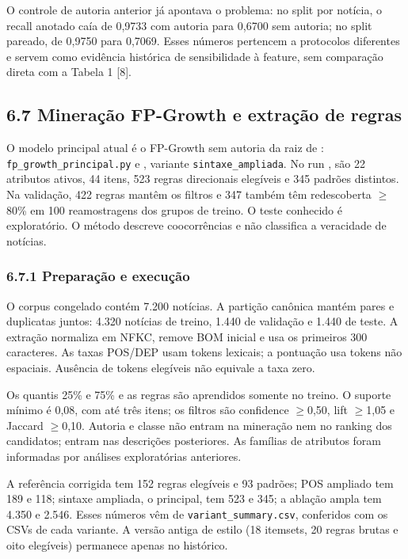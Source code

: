 \documentclass[
  brazilian,
  11pt,
]{article}
\begin{document}
O controle de autoria anterior já apontava o problema: no split por notícia, o recall anotado caía de 0,9733 com autoria para 0,6700 sem autoria; no split pareado, de 0,9750 para 0,7069. Esses números pertencem a protocolos diferentes e servem como evidência histórica de sensibilidade à feature, sem comparação direta com a Tabela 1 {[}8{]}.

\subsection{6.7 Mineração FP-Growth e extração de regras}

O modelo principal atual é o FP-Growth sem autoria da raiz de : \texttt{fp\_growth\_principal.py} e , variante \texttt{sintaxe\_ampliada}. No run , são 22 atributos ativos, 44 itens, 523 regras direcionais elegíveis e 345 padrões distintos. Na validação, 422 regras mantêm os filtros e 347 também têm redescoberta $\geq$80\% em 100 reamostragens dos grupos de treino. O teste conhecido é exploratório. O método descreve coocorrências e não classifica a veracidade de notícias.

\subsubsection{6.7.1 Preparação e execução}

O corpus congelado contém 7.200 notícias. A partição canônica mantém pares e duplicatas juntos: 4.320 notícias de treino, 1.440 de validação e 1.440 de teste. A extração normaliza em NFKC, remove BOM inicial e usa os primeiros 300 caracteres. As taxas POS/DEP usam tokens lexicais; a pontuação usa tokens não espaciais. Ausência de tokens elegíveis não equivale a taxa zero.

Os quantis 25\% e 75\% e as regras são aprendidos somente no treino. O suporte mínimo é 0,08, com até três itens; os filtros são confidence $\geq$0,50, lift $\geq$1,05 e Jaccard $\geq$0,10. Autoria e classe não entram na mineração nem no ranking dos candidatos; entram nas descrições posteriores. As famílias de atributos foram informadas por análises exploratórias anteriores.

A referência corrigida tem 152 regras elegíveis e 93 padrões; POS ampliado tem 189 e 118; sintaxe ampliada, o principal, tem 523 e 345; a ablação ampla tem 4.350 e 2.546. Esses números vêm de \texttt{variant\_summary.csv}, conferidos com os CSVs de cada variante. A versão antiga de estilo (18 itemsets, 20 regras brutas e oito elegíveis) permanece apenas no histórico.
\end{document}
